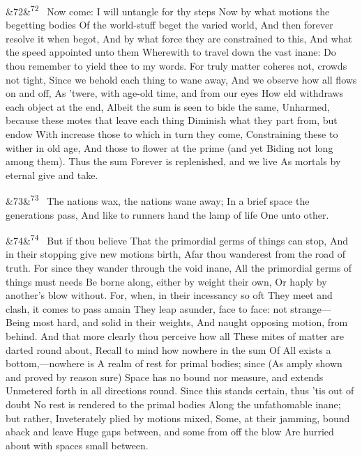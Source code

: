\documentclass[12pt]{article}
\newcommand{\para}[1][]{\par\noindent\ifx&#1&\else\textsuperscript{\footnotesize #1}~\fi}
\begin{document}
\para[72] Now come: I will untangle for thy steps Now by what motions the begetting bodies Of the world-stuff beget the varied world, And then forever resolve it when begot, And by what force they are constrained to this, And what the speed appointed unto them Wherewith to travel down the vast inane: Do thou remember to yield thee to my words. For truly matter coheres not, crowds not tight, Since we behold each thing to wane away, And we observe how all flows on and off, As 'twere, with age-old time, and from our eyes How eld withdraws each object at the end, Albeit the sum is seen to bide the same, Unharmed, because these motes that leave each thing Diminish what they part from, but endow With increase those to which in turn they come, Constraining these to wither in old age, And those to flower at the prime (and yet Biding not long among them). Thus the sum Forever is replenished, and we live As mortals by eternal give and take.

\para[73] The nations wax, the nations wane away; In a brief space the generations pass, And like to runners hand the lamp of life One unto other.

\para[74] But if thou believe That the primordial germs of things can stop, And in their stopping give new motions birth, Afar thou wanderest from the road of truth. For since they wander through the void inane, All the primordial germs of things must needs Be borne along, either by weight their own, Or haply by another's blow without. For, when, in their incessancy so oft They meet and clash, it comes to pass amain They leap asunder, face to face: not strange--- Being most hard, and solid in their weights, And naught opposing motion, from behind. And that more clearly thou perceive how all These mites of matter are darted round about, Recall to mind how nowhere in the sum Of All exists a bottom,---nowhere is A realm of rest for primal bodies; since (As amply shown and proved by reason sure) Space has no bound nor measure, and extends Unmetered forth in all directions round. Since this stands certain, thus 'tis out of doubt No rest is rendered to the primal bodies Along the unfathomable inane; but rather, Inveterately plied by motions mixed, Some, at their jamming, bound aback and leave Huge gaps between, and some from off the blow Are hurried about with spaces small between.
\end{document}

